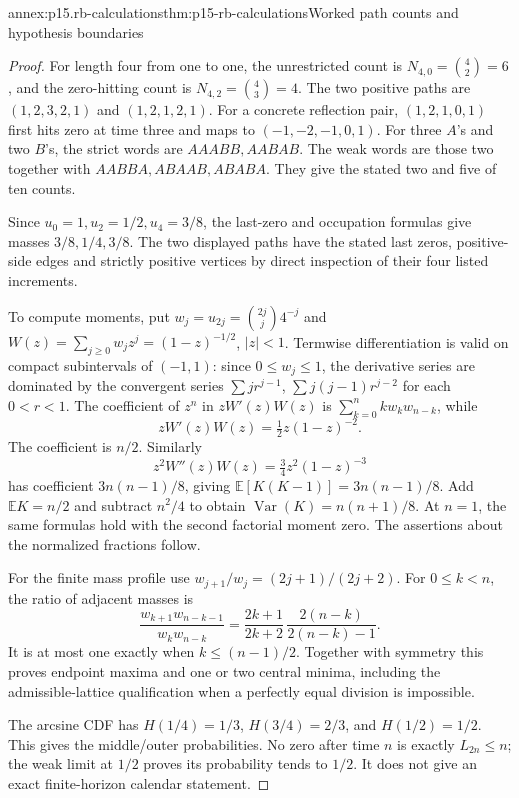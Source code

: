 \begin{annexitem}{annex:p15.rb-calculations}{thm:p15-rb-calculations}{Worked path counts and hypothesis boundaries}
\begin{proof}
For length four from one to one, the unrestricted count is
\(N_{4,0}=\binom42=6\), and the zero-hitting count is
\(N_{4,2}=\binom43=4\).
The two positive paths are
\((1,2,3,2,1)\) and \((1,2,1,2,1)\).
For a concrete reflection pair, \((1,2,1,0,1)\) first hits
zero at time three and maps to \((-1,-2,-1,0,1)\).
For three \(A\)'s and two \(B\)'s, the strict words are
\(AAABB,AABAB\). The weak words are those two together with
\(AABBA,ABAAB,ABABA\).
They give the stated two and five of ten counts.

Since \(u_0=1,u_2=1/2,u_4=3/8\), the last-zero and
occupation formulas give masses \(3/8,1/4,3/8\).
The two displayed paths have the stated last zeros, positive-side
edges and strictly positive vertices by direct inspection of
their four listed increments.

To compute moments, put \(w_j=u_{2j}=\binom{2j}{j}4^{-j}\)
and \(W(z)=\sum_{j\geq0}w_jz^j=(1-z)^{-1/2}\), \(|z|<1\).
Termwise differentiation is valid on compact subintervals of
\((-1,1)\): since \(0\leq w_j\leq1\), the derivative series
are dominated by the convergent series
\(\sum j r^{j-1}\), \(\sum j(j-1)r^{j-2}\) for each \(0<r<1\).
The coefficient of \(z^n\) in \(zW'(z)W(z)\) is
\(\sum_{k=0}^n k w_k w_{n-k}\), while
\[
 zW'(z)W(z)=\tfrac12z(1-z)^{-2}.
 \]
The coefficient is \(n/2\).
Similarly
\[
 z^2W''(z)W(z)=\tfrac34z^2(1-z)^{-3}
 \]
has coefficient \(3n(n-1)/8\), giving
\(\mathbb E[K(K-1)]=3n(n-1)/8\).
Add \(\mathbb EK=n/2\) and subtract \(n^2/4\) to obtain
\(\operatorname{Var}(K)=n(n+1)/8\).
At \(n=1\), the same formulas hold with the second factorial
moment zero. The assertions about the normalized fractions follow.

For the finite mass profile use
\(w_{j+1}/w_j=(2j+1)/(2j+2)\).
For \(0\leq k<n\), the ratio of adjacent masses is
\[
 \frac{w_{k+1}w_{n-k-1}}{w_kw_{n-k}}
 =\frac{2k+1}{2k+2}\,
                  \frac{2(n-k)}{2(n-k)-1}.
 \]
It is at most one exactly when \(k\leq(n-1)/2\).
Together with symmetry this proves endpoint maxima and
one or two central minima, including the admissible-lattice
qualification when a perfectly equal division is impossible.

The arcsine CDF has \(H(1/4)=1/3\), \(H(3/4)=2/3\),
and \(H(1/2)=1/2\).
This gives the middle/outer probabilities.
No zero after time \(n\) is exactly \(L_{2n}\leq n\);
the weak limit at \(1/2\) proves its probability tends to \(1/2\).
It does not give an exact finite-horizon calendar statement.


\end{proof}
\end{annexitem}
